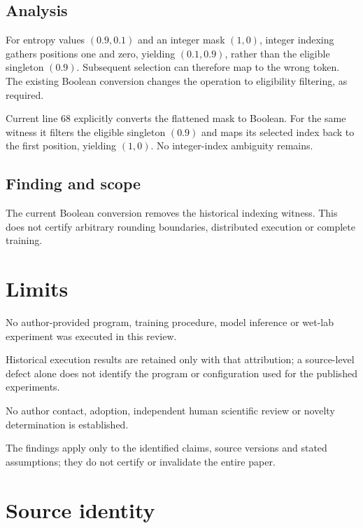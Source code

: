 \documentclass[11pt]{article}
\begin{document}
\subsection*{Analysis}

For entropy values \((0.9,0.1)\) and an integer mask \((1,0)\), integer indexing gathers positions one and zero, yielding \((0.1,0.9)\), rather than the eligible singleton \((0.9)\). Subsequent selection can therefore map to the wrong token. The existing Boolean conversion changes the operation to eligibility filtering, as required.

Current line 68 explicitly converts the flattened mask to Boolean. For the same witness it filters the eligible singleton \((0.9)\) and maps its selected index back to the first position, yielding \((1,0)\). No integer-index ambiguity remains.

\subsection*{Finding and scope}

The current Boolean conversion removes the historical indexing witness. This does not certify arbitrary rounding boundaries, distributed execution or complete training.

\section*{Limits}

No author-provided program, training procedure, model inference or wet-lab experiment was executed in this review.\par

Historical execution results are retained only with that attribution; a source-level defect alone does not identify the program or configuration used for the published experiments.\par

No author contact, adoption, independent human scientific review or novelty determination is established.\par

The findings apply only to the identified claims, source versions and stated assumptions; they do not certify or invalidate the entire paper.\par

\section*{Source identity}
\end{document}

